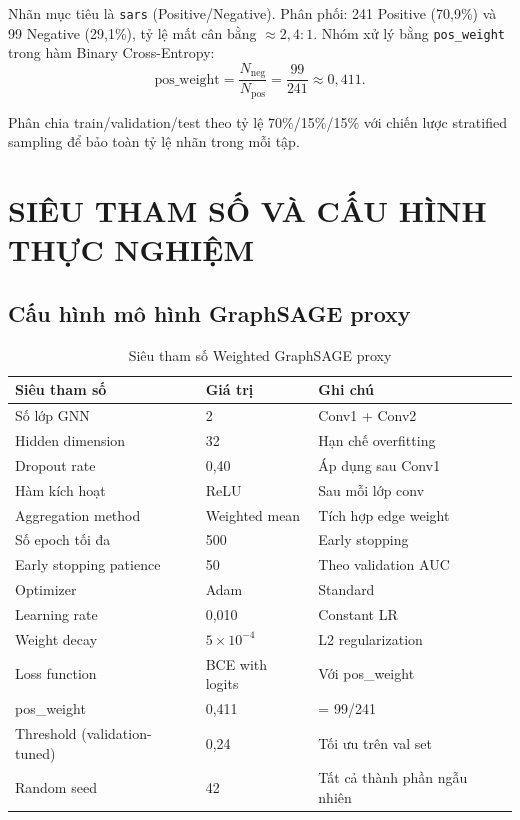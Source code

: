 \documentclass[12pt,a4paper]{report}
\theoremstyle{definition}
\begin{document}
Nhãn mục tiêu là \texttt{sars} (Positive/Negative). Phân phối: 241 Positive (70,9\%) và 99 Negative (29,1\%), tỷ lệ mất cân bằng $\approx 2{,}4:1$. Nhóm xử lý bằng \texttt{pos\_weight} trong hàm Binary Cross-Entropy:
\[
  \text{pos\_weight} = \frac{N_{\text{neg}}}{N_{\text{pos}}} = \frac{99}{241} \approx 0{,}411.
\]

Phân chia train/validation/test theo tỷ lệ 70\%/15\%/15\% với chiến lược stratified sampling để bảo toàn tỷ lệ nhãn trong mỗi tập.


\chapter{SIÊU THAM SỐ VÀ CẤU HÌNH THỰC NGHIỆM}
\label{appendix:hyperparams}

\section{Cấu hình mô hình GraphSAGE proxy}

\begin{table}[H]
\centering
\caption{Siêu tham số Weighted GraphSAGE proxy}
\label{tab:hyperparams}
\begin{tabular}{L{6cm} C{4cm} L{4cm}}
\toprule
\textbf{Siêu tham số} & \textbf{Giá trị} & \textbf{Ghi chú}\\
\midrule
Số lớp GNN                    & 2         & Conv1 + Conv2\\
Hidden dimension               & 32        & Hạn chế overfitting\\
Dropout rate                   & 0,40      & Áp dụng sau Conv1\\
Hàm kích hoạt                  & ReLU      & Sau mỗi lớp conv\\
Aggregation method             & Weighted mean & Tích hợp edge weight\\
Số epoch tối đa                & 500       & Early stopping\\
Early stopping patience        & 50        & Theo validation AUC\\
Optimizer                      & Adam      & Standard\\
Learning rate                  & 0,010     & Constant LR\\
Weight decay                   & $5 \times 10^{-4}$ & L2 regularization\\
Loss function                  & BCE with logits & Với pos\_weight\\
pos\_weight                    & 0,411     & = 99/241\\
Threshold (validation-tuned)   & 0,24      & Tối ưu trên val set\\
Random seed                    & 42        & Tất cả thành phần ngẫu nhiên\\
\bottomrule
\end{tabular}
\end{table}
\end{document}
